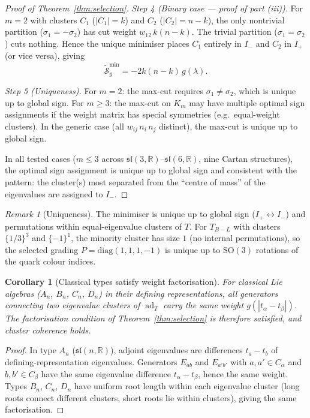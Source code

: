 \documentclass[11pt]{article}
\theoremstyle{plain}
\newtheorem{corollary}[theorem]{Corollary}
\theoremstyle{definition}
\theoremstyle{remark}
\newtheorem*{remark}{Remark}
\newcommand{\sln}[1]{\mathfrak{sl}(#1,\mathbb{R})}
\newcommand{\TBL}{T_{B\!-\!L}}
\newcommand{\ad}{\operatorname{ad}}
\begin{document}
\begin{proof}[Proof of Theorem~\ref{thm:selection}]
\emph{Step 4 (Binary case --- proof of part (iii)).}
For $m = 2$ with clusters $C_1$ ($|C_1| = k$) and
$C_2$ ($|C_2| = n - k$), the only nontrivial partition
($\sigma_1 = -\sigma_2$) has cut weight $w_{12}\,k(n-k)$.
The trivial partition ($\sigma_1 = \sigma_2$) cuts nothing.
Hence the unique minimiser places $C_1$ entirely in $I_-$
and $C_2$ in $I_+$ (or vice versa), giving
\[
  \widetilde{\mathcal{S}}_g^{\min}
  = -2k(n{-}k)\,g(\lambda).
\]

\emph{Step 5 (Uniqueness).}
For $m = 2$: the max-cut requires $\sigma_1 \ne \sigma_2$, which
is unique up to global sign.  For $m \ge 3$: the max-cut on $K_m$
may have multiple optimal sign assignments if the weight matrix has
special symmetries (e.g.\ equal-weight clusters).  In the generic
case (all $w_{ij}\,n_i\,n_j$ distinct), the max-cut is unique up
to global sign.

In all tested cases ($m \le 3$ across $\sln{3}$--$\sln{6}$,
nine Cartan structures), the optimal sign assignment is unique
up to global sign and consistent with the pattern: the cluster(s)
most separated from the ``centre of mass'' of the eigenvalues
are assigned to $I_-$.
\qedhere
\end{proof}

\begin{remark}[Uniqueness]
The minimiser is unique up to global sign ($I_+ \leftrightarrow I_-$)
and permutations within equal-eigenvalue clusters of $T$.
For $\TBL$ with clusters $\{1/3\}^3$ and $\{-1\}^1$, the minority
cluster has size $1$ (no internal permutations), so the selected
grading $P = \mathrm{diag}(1,1,1,-1)$ is unique up to
$\mathrm{SO}(3)$ rotations of the quark colour indices.
\end{remark}

\begin{corollary}[Classical types satisfy weight factorisation]
\label{cor:classical}
For classical Lie algebras ($A_n$, $B_n$, $C_n$, $D_n$) in their
defining representations, all generators connecting two eigenvalue
clusters of $\ad_T$ carry the same weight $g(|t_\alpha - t_\beta|)$.
The factorisation condition of Theorem~\ref{thm:selection} is
therefore satisfied, and cluster coherence holds.
\end{corollary}

\begin{proof}
In type $A_n$ ($\sln{n}$), adjoint eigenvalues are differences
$t_a - t_b$ of defining-representation eigenvalues.  Generators
$E_{ab}$ and $E_{a'b'}$ with $a, a' \in C_\alpha$ and
$b, b' \in C_\beta$ have the same eigenvalue difference
$t_\alpha - t_\beta$, hence the same weight.  Types $B_n$, $C_n$,
$D_n$ have uniform root length within each eigenvalue cluster
(long roots connect different clusters, short roots lie within
clusters), giving the same factorisation.
\end{proof}
\end{document}
